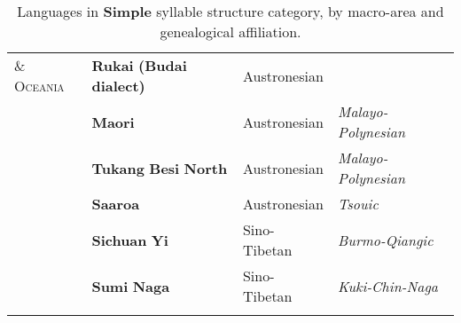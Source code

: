 \begin{table}
\begin{tabularx}{\textwidth}{XXXX}
\textsc{\&} \textsc{Oceania} & \textbf{Rukai} \textbf{(Budai} \textbf{dialect)} & Austronesian & \\
\hhline{-~~~} & \textbf{Maori} & Austronesian & \textit{Malayo-Polynesian}\\
& \textbf{Tukang} \textbf{Besi} \textbf{North} & Austronesian & \textit{Malayo-Polynesian}\\
& \textbf{Saaroa} & Austronesian & \textit{Tsouic}\\
& \textbf{Sichuan} \textbf{Yi} & Sino-Tibetan & \textit{Burmo-Qiangic}\\
& \textbf{Sumi} \textbf{Naga} & Sino-Tibetan & \textit{Kuki-Chin-Naga}\\
\hhline{~---}
\lspbottomrule
\end{tabularx}
\caption{\label{tab:key:2.4.} Languages in \textbf{Simple} syllable structure category, by macro-area and genealogical affiliation.}
\end{table}







